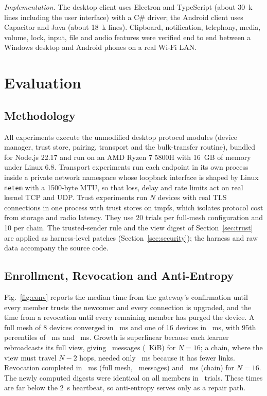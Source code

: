\documentclass[conference,a4paper]{IEEEtran}
\begin{document}
\textit{Implementation.} The desktop client uses Electron and TypeScript (about 30~k lines including the user interface) with a C\# driver; the Android client uses Capacitor and Java (about 18~k lines). Clipboard, notification, telephony, media, volume, lock, input, file and audio features were verified end to end between a Windows desktop and Android phones on a real Wi-Fi LAN.

\section{Evaluation}
\label{sec:eval}
\subsection{Methodology}
All experiments execute the unmodified desktop protocol modules (device manager, trust store, pairing, transport and the bulk-transfer routine), bundled for Node.js 22.17 and run on an AMD Ryzen 7 5800H with 16~GB of memory under Linux 6.8. Transport experiments run each endpoint in its own process inside a private network namespace whose loopback interface is shaped by Linux \texttt{netem} with a 1500-byte MTU, so that loss, delay and rate limits act on real kernel TCP and UDP. Trust experiments run $N$ devices with real TLS connections in one process with trust stores on tmpfs, which isolates protocol cost from storage and radio latency. They use 20 trials per full-mesh configuration and 10 per chain. The trusted-sender rule and the view digest of Section~\ref{sec:trust} are applied as harness-level patches (Section~\ref{sec:security}); the harness and raw data accompany the source code.

\subsection{Enrollment, Revocation and Anti-Entropy}
Fig.~\ref{fig:conv} reports the median time from the gateway's confirmation until every member trusts the newcomer and every connection is upgraded, and the time from a revocation until every remaining member has purged the device. A full mesh of 8 devices converged in \EnrMeshEight~ms and one of 16 devices in \EnrMeshSixteen~ms, with 95th percentiles of \EnrMeshEightPnf~ms and \EnrMeshSixteenPnf~ms. Growth is superlinear because each learner rebroadcasts its full view, giving \SyncMeshSixteen\ messages (\SyncKiBMeshSixteen~KiB) for $N=16$; a chain, where the view must travel $N-2$ hops, needed only \EnrChainSixteen~ms because it has fewer links. Revocation completed in \RevMeshSixteen~ms (full mesh, \RevMsgsMeshSixteen\ messages) and \RevChainSixteen~ms (chain) for $N=16$. The newly computed digests were identical on all members in \AllDigestsAgree\ trials. These times are far below the 2~s heartbeat, so anti-entropy serves only as a repair path.
\end{document}
